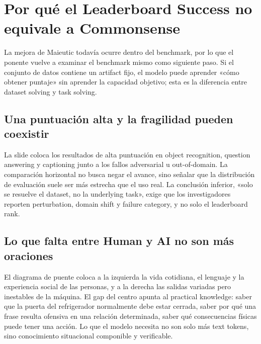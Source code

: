 \section{Por qué el Leaderboard Success no equivale a Commonsense}

La mejora de Maieutic todavía ocurre dentro del benchmark, por lo que el ponente vuelve a examinar el benchmark mismo como siguiente paso. Si el conjunto de datos contiene un artifact fijo, el modelo puede aprender «cómo obtener puntaje» sin aprender la capacidad objetivo; esta es la diferencia entre dataset solving y task solving.

\subsection{Una puntuación alta y la fragilidad pueden coexistir}

La slide coloca los resultados de alta puntuación en object recognition, question answering y captioning junto a los fallos adversarial u out-of-domain. La comparación horizontal no busca negar el avance, sino señalar que la distribución de evaluación suele ser más estrecha que el uso real. La conclusión inferior, «solo se resuelve el dataset, no la underlying task», exige que los investigadores reporten perturbation, domain shift y failure category, y no solo el leaderboard rank.



\subsection{Lo que falta entre Human y AI no son más oraciones}

El diagrama de puente coloca a la izquierda la vida cotidiana, el lenguaje y la experiencia social de las personas, y a la derecha las salidas variadas pero inestables de la máquina. El gap del centro apunta al practical knowledge: saber que la puerta del refrigerador normalmente debe estar cerrada, saber por qué una frase resulta ofensiva en una relación determinada, saber qué consecuencias físicas puede tener una acción. Lo que el modelo necesita no son solo más text tokens, sino conocimiento situacional componible y verificable.


